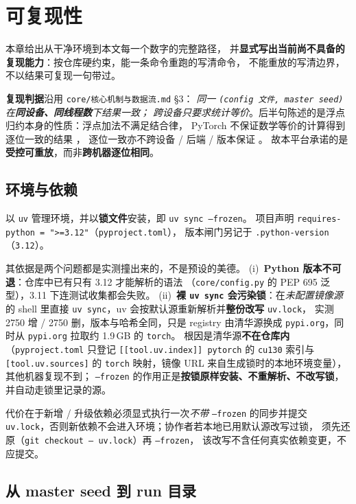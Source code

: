 \section{可复现性}\label{sec:repro}

本章给出从干净环境到本文每一个数字的完整路径，
并\textbf{显式写出当前尚不具备的复现能力}：按仓库硬约束，能一条命令重跑的写清命令，
不能重放的写清边界，不以结果可复现一句带过。

\textbf{复现判据}沿用 \texttt{core/核心机制与数据流.md} \S3：
\emph{同一 \texttt{(config 文件, master seed)} 在\textbf{同设备、同线程数}下结果一致；
跨设备只要求统计等价}。后半句陈述的是浮点归约本身的性质：浮点加法不满足结合律，
PyTorch 不保证数学等价的计算得到逐位一致的结果 \citep{bib163_unknownn.d.}，
逐位一致亦不跨设备 / 后端 / 版本保证 \citep{bib164_unknownn.d.}。
故本平台承诺的是\textbf{受控可重放}，而非\textbf{跨机器逐位相同}。

\subsection{环境与依赖}

以 \texttt{uv} 管理环境，并以\textbf{锁文件}安装，即 \texttt{uv sync --frozen}。
项目声明 \texttt{requires-python = ">=3.12"}（\texttt{pyproject.toml}），
版本闸门另记于 \texttt{.python-version}（\texttt{3.12}）。

其依据是两个问题都是实测撞出来的，不是预设的美德。
(i)~\textbf{Python 版本不可退}：仓库中已有只有 3.12 才能解析的语法
（\texttt{core/config.py} 的 PEP 695 泛型），3.11 下连测试收集都会失败。
(ii)~\textbf{裸 \texttt{uv sync} 会污染锁}：在\emph{未配置镜像源}的 shell 里直接
\texttt{uv sync}，uv 会按默认源重新解析并\textbf{整份改写} \texttt{uv.lock}，
实测 2750 增 / 2750 删，版本与哈希全同，只是 registry 由清华源换成
\texttt{pypi.org}，同时从 \texttt{pypi.org} 拉取约 1.9\,GB 的 \texttt{torch}。
根因是清华源\textbf{不在仓库内}（\texttt{pyproject.toml} 只登记
\texttt{[[tool.uv.index]] pytorch} 的 \texttt{cu130} 索引与 \texttt{[tool.uv.sources]}
的 \texttt{torch} 映射，镜像 URL 来自生成锁时的本地环境变量），其他机器复现不到；
\texttt{--frozen} 的作用正是\textbf{按锁原样安装、不重解析、不改写锁}，
并自动走锁里记录的源。

代价在于新增 / 升级依赖必须显式执行一次\emph{不带} \texttt{--frozen} 的同步并提交
\texttt{uv.lock}，否则新依赖不会进入环境；协作者若本地已用默认源改写过锁，
须先还原（\texttt{git checkout -- uv.lock}）再 \texttt{--frozen}，
该改写不含任何真实依赖变更，不应提交。

\subsection{从 master seed 到 run 目录}

